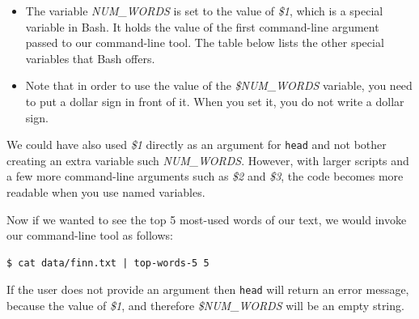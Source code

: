\documentclass[
]{book}
\newenvironment{Shaded}{\begin{snugshade}}{\end{snugshade}}
\newcommand{\CommentTok}[1]{\textcolor[rgb]{0.56,0.35,0.01}{\textit{#1}}}
\newcommand{\ExtensionTok}[1]{#1}
\newcommand{\FunctionTok}[1]{\textcolor[rgb]{0.00,0.00,0.00}{#1}}
\newcommand{\KeywordTok}[1]{\textcolor[rgb]{0.13,0.29,0.53}{\textbf{#1}}}
\newcommand{\NormalTok}[1]{#1}
\newcommand{\StringTok}[1]{\textcolor[rgb]{0.31,0.60,0.02}{#1}}
\newcommand{\VariableTok}[1]{\textcolor[rgb]{0.00,0.00,0.00}{#1}}
\providecommand{\tightlist}{%
  \setlength{\itemsep}{0pt}\setlength{\parskip}{0pt}}
\theoremstyle{definition}
\theoremstyle{definition}
\theoremstyle{definition}
\theoremstyle{remark}
\begin{document}
\begin{Shaded}
\end{Shaded}

\begin{itemize}
\tightlist
\item
  The variable \emph{NUM\_WORDS} is set to the value of \emph{\$1}, which is a special variable in Bash. It holds the value of the first command-line argument passed to our command-line tool. The table below lists the other special variables that Bash offers.
\item
  Note that in order to use the value of the \emph{\$NUM\_WORDS} variable, you need to put a dollar sign in front of it. When you set it, you do not write a dollar sign.
\end{itemize}

\begin{rmdtip}
We could have also used \emph{\$1} directly as an argument for \texttt{head} and not bother creating an extra variable such \emph{NUM\_WORDS}. However, with larger scripts and a few more command-line arguments such as \emph{\$2} and \emph{\$3}, the code becomes more readable when you use named variables.
\end{rmdtip}

Now if we wanted to see the top 5 most-used words of our text, we would invoke our command-line tool as follows:

\begin{verbatim}
$ cat data/finn.txt | top-words-5 5
\end{verbatim}

If the user does not provide an argument then \texttt{head} will return an error message, because the value of \emph{\$1}, and therefore \emph{\$NUM\_WORDS} will be an empty string.

\begin{Shaded}
\end{Shaded}
\end{document}
